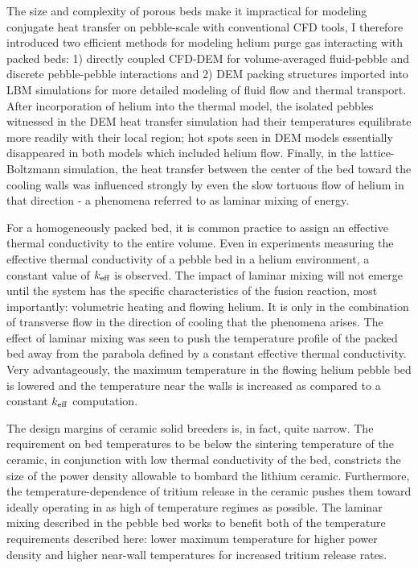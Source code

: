The size and complexity of porous beds make it impractical for modeling conjugate heat transfer on pebble-scale with conventional CFD tools, I therefore introduced two efficient methods for modeling helium purge gas interacting with packed beds: 1) directly coupled CFD-DEM for volume-averaged fluid-pebble and discrete pebble-pebble interactions and 2) DEM packing structures imported into LBM simulations for more detailed modeling of fluid flow and thermal transport. After incorporation of helium into the thermal model, the isolated pebbles witnessed in the DEM heat transfer simulation had their temperatures equilibrate more readily with their local region; hot spots seen in DEM models essentially disappeared in both models which included helium flow. Finally, in the lattice-Boltzmann simulation, the heat transfer between the center of the bed toward the cooling walls was influenced strongly by even the slow tortuous flow of helium in that direction - a phenomena referred to as laminar mixing of energy.

For a homogeneously packed bed, it is common practice to assign an effective thermal conductivity to the entire volume. Even in experiments measuring the effective thermal conductivity of a pebble bed in a helium environment, a constant value of $k_\text{eff}$ is observed. The impact of laminar mixing will not emerge until the system has the specific characteristics of the fusion reaction, most importantly: volumetric heating and flowing helium. It is only in the combination of transverse flow in the direction of cooling that the phenomena arises. The effect of laminar mixing was seen to push the temperature profile of the packed bed away from the parabola defined by a constant effective thermal conductivity. Very advantageously, the maximum temperature in the flowing helium pebble bed is lowered and the temperature near the walls is increased as compared to a constant $k_\text{eff}$ computation.

The design margins of ceramic solid breeders is, in fact, quite narrow. The requirement on bed temperatures to be below the sintering temperature of the ceramic, in conjunction with low thermal conductivity of the bed, constricts the size of the power density allowable to bombard the lithium ceramic. Furthermore, the temperature-dependence of tritium release in the ceramic pushes them toward ideally operating in as high of temperature regimes as possible. The laminar mixing described in the pebble bed works to benefit both of the temperature requirements described here: lower maximum temperature for higher power density and higher near-wall temperatures for increased tritium release rates.